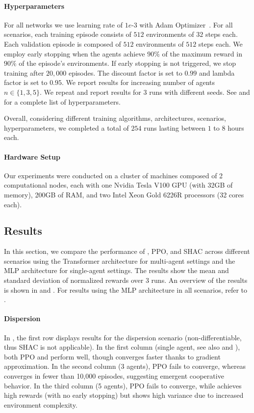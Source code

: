 \paragraph{Hyperparameters}
For all networks we use learning rate of $1e\text{-}3$ with Adam Optimizer~\cite{Kingma14}. For all scenarios, each training episode consists of $512$ environments of $32$ steps each. Each validation episode is composed of $512$ environments of $512$ steps each. We employ early stopping when the agents achieve $90\%$ of the maximum reward in $90\%$ of the episode's environments. If early stopping is not triggered, we stop training after $20,000$ episodes. The discount factor is set to $0.99$ and lambda factor is set to $0.95$. We report results for increasing number of agents $n\in\{1,3,5\}$. We repeat and report results for $3$ runs with different seeds. See  and  for a complete list of hyperparameters.

Overall, considering different training algorithms, architectures, scenarios, hyperparameters, we completed a total of $254$ runs lasting between $1$ to $8$ hours each. 

\paragraph{Hardware Setup}
Our experiments were conducted on a cluster of machines composed of 2 computational nodes, each with one Nvidia Tesla V100 GPU (with 32GB of memory), 200GB of RAM, and two Intel Xeon Gold 6226R processors (32 cores each).

\subsection{Results}
In this section, we compare the performance of \fname{}, PPO, and SHAC across different scenarios using the Transformer architecture for multi-agent settings and the MLP architecture for single-agent settings. The results show the mean and standard deviation of normalized rewards over 3 runs. An overview of the results is shown in  and . For results using the MLP architecture in all scenarios, refer to .

\paragraph{Dispersion}
In , the first row displays results for the dispersion scenario (non-differentiable, thus SHAC is not applicable). In the first column (single agent, see also  and ), both PPO and \fname{} perform well, though \fname{} converges faster thanks to gradient approximation. In the second column (3 agents), PPO fails to converge, whereas \fname{} converges in fewer than 10,000 episodes, suggesting emergent cooperative behavior. In the third column (5 agents), PPO fails to converge, while \fname{} achieves high rewards (with no early stopping) but shows high variance due to increased environment complexity.

